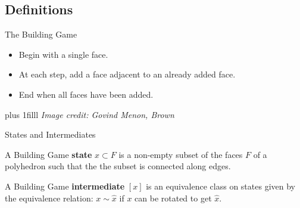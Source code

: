 \documentclass{beamer}
\newcommand{\btVFill}{\vskip0pt plus 1filll}
\begin{document}
\subsection{Definitions}
\begin{frame}{The Building Game}
%
\begin{itemize}
  \item Begin with a single face.
  \item At each step, add a face adjacent to an already added face.
  \item End when all faces have been added.
\end{itemize}
\btVFill
\textit{\scriptsize Image credit: Govind Menon, Brown} 

\end{frame}
\begin{frame}{States and Intermediates}
\begin{definition}
  A Building Game \textbf{state} $x \subset F$ is a non-empty subset of the faces $F$ of a polyhedron such that the the subset is connected along edges. 
\end{definition} 
\begin{definition}
A Building Game \textbf{intermediate} $[x]$ is an equivalence class on states given by the equivalence relation: $x \sim \hat{x}$ if $x$ can be rotated to get $\hat{x}$.
\end{definition}

\end{frame}
\end{document}
